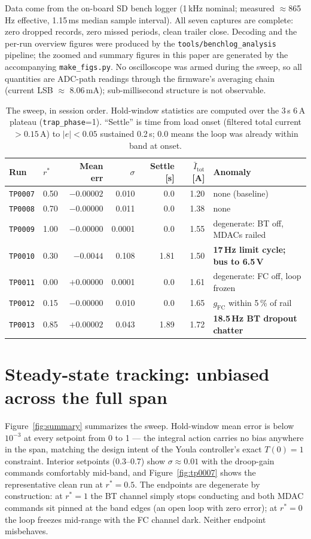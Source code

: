 \documentclass[11pt]{article}
\newcommand{\code}[1]{\texttt{#1}}
\begin{document}
Data come from the on-board SD bench logger (1\,kHz nominal; measured
$\approx$865\,Hz effective, 1.15\,ms median sample interval). All seven captures are
complete: zero dropped records, zero missed periods, clean trailer close. Decoding and
the per-run overview figures were produced by the \code{tools/benchlog\_analysis}
pipeline; the zoomed and summary figures in this paper are generated by the
accompanying \code{make\_figs.py}. No oscilloscope was armed during the sweep, so all
quantities are ADC-path readings through the firmware's averaging chain
(current LSB $\approx$ 8.06\,mA); sub-millisecond structure is not observable.

\begin{table}[H]
\centering
\small
\caption{The sweep, in session order. Hold-window statistics are computed over the 3\,s
6\,A plateau (\code{trap\_phase}=1). ``Settle'' is time from load onset (filtered total
current $>0.15$\,A) to $|e|<0.05$ sustained 0.2\,s; $0.0$ means the loop was already
within band at onset.}
\label{tab:sweep}
\begin{tabular}{llrrrrl}
\toprule
Run & $r^\ast$ & Mean err & $\sigma$ & Settle [s] & $\bar{I}_\mathrm{tot}$ [A] & Anomaly \\
\midrule
\code{TP0007} & 0.50 & $-0.00002$ & 0.010 & 0.0 & 1.20 & none (baseline) \\
\code{TP0008} & 0.70 & $-0.00000$ & 0.011 & 0.0 & 1.38 & none \\
\code{TP0009} & 1.00 & $-0.00000$ & 0.0001 & 0.0 & 1.55 & degenerate: BT off, MDACs railed \\
\code{TP0010} & 0.30 & $-0.0044$ & 0.108 & 1.81 & 1.50 & \textbf{17\,Hz limit cycle; bus to 6.5\,V} \\
\code{TP0011} & 0.00 & $+0.00000$ & 0.0001 & 0.0 & 1.61 & degenerate: FC off, loop frozen \\
\code{TP0012} & 0.15 & $-0.00000$ & 0.010 & 0.0 & 1.65 & $g_\mathrm{FC}$ within 5\,\% of rail \\
\code{TP0013} & 0.85 & $+0.00002$ & 0.043 & 1.89 & 1.72 & \textbf{18.5\,Hz BT dropout chatter} \\
\bottomrule
\end{tabular}
\end{table}

\section{Steady-state tracking: unbiased across the full span}

Figure~\ref{fig:summary} summarizes the sweep. Hold-window mean error is below
$10^{-3}$ at every setpoint from 0 to 1 --- the integral action carries no bias
anywhere in the span, matching the design intent of the Youla controller's exact
$T(0)=1$ constraint. Interior setpoints (0.3--0.7) show $\sigma\approx0.01$ with the
droop-gain commands comfortably mid-band, and Figure~\ref{fig:tp0007} shows the
representative clean run at $r^\ast=0.5$. The endpoints are degenerate by
construction: at $r^\ast=1$ the BT channel simply stops conducting and both MDAC
commands sit pinned at the band edges (an open loop with zero error); at $r^\ast=0$
the loop freezes mid-range with the FC channel dark. Neither endpoint misbehaves.
\end{document}
